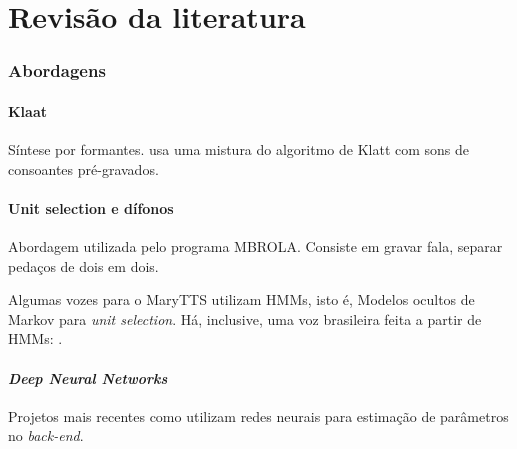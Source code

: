 

\chapter{Revisão da literatura}



\subsection{Abordagens}
\subsubsection{Klaat}
Síntese por formantes. \cite{espeakng} usa uma mistura do algoritmo de Klatt com
sons de consoantes pré-gravados.
\subsubsection{Unit selection e dífonos}
Abordagem utilizada pelo programa MBROLA. Consiste em gravar fala, separar
pedaços de dois em dois.

Algumas vozes para o MaryTTS \cite{marytts} utilizam HMMs, isto é, Modelos
ocultos de Markov para \emph{unit selection}. Há, inclusive, uma voz brasileira
feita a partir de HMMs: \cite{couto}.
\subsubsection{\emph{Deep Neural Networks}}
Projetos mais recentes como \cite{merlin} utilizam redes neurais para estimação de
parâmetros no \emph{back-end}.


